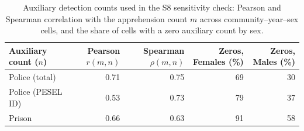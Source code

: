 \begin{table}[H]
\centering
\caption{\label{tbl-nsource-aux}Auxiliary detection counts used in the S8 sensitivity check: Pearson and Spearman correlation with the apprehension count $m$ across community--year--sex cells, and the share of cells with a zero auxiliary count by sex.}
\begin{tabular}{lrrrr} \toprule
Auxiliary count ($n$) & Pearson $r(m,n)$ & Spearman $\rho(m,n)$ & Zeros, Females (\%) & Zeros, Males (\%) \\ \midrule
Police (total) & 0.71 & 0.75 & 69 & 30 \\
Police (PESEL ID) & 0.53 & 0.73 & 79 & 37 \\
Prison & 0.66 & 0.63 & 91 & 58 \\
\bottomrule
\end{tabular}
\end{table}
